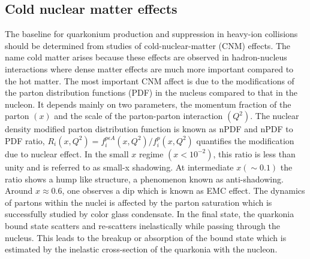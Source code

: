 


\subsection{Cold nuclear matter effects}

The baseline for quarkonium production and suppression in heavy-ion collisions 
should be determined from studies of
cold-nuclear-matter (CNM) effects. The name cold matter 
arises because these effects are observed in hadron-nucleus interactions 
where dense matter effects are much more important compared to the hot matter.
The most important CNM affect is due to the modifications of the parton distribution
functions (PDF) in the nucleus compared to that in the nucleon.
It depends mainly on two parameters, 
the momentum fraction of the parton $(x)$ and the scale of the parton-parton 
interaction $(Q^2)$. The nuclear density modified parton distribution
function is known as nPDF and nPDF to PDF ratio,
$R_i(x,Q^2)=f_i^{p \epsilon A} (x, Q^2) /f_i^p  (x, Q^2)$
quantifies the modification due to nuclear effect. 
In the small $x$ regime $(x < 10^{-2})$, this ratio is less than unity
and is referred to as small-x shadowing. At intermediate  $x(\sim 0.1)$
the ratio shows a hump like structure, a phenomenon known as 
anti-shadowing. Around $x\approx 0.6$, one observes a dip which is known as EMC
effect. The dynamics of partons 
within the nuclei is affected by the parton saturation which is successfully
studied by color glass condensate. In the 
final state, the quarkonia bound state scatters and re-scatters inelastically
while passing through the nucleus. This leads to 
the breakup or absorption of the bound state which is estimated by the
inelastic cross-section of the quarkonia with the nucleon. 

